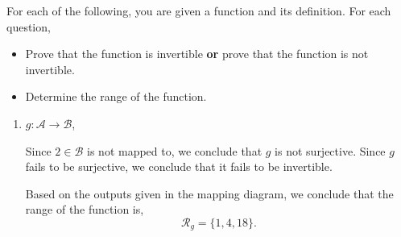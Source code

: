 \documentclass[12pt]{article} %
\begin{document}
\begin{qstn}[2][(8 points)]
  For each of the following, you are given a function and its definition. For each question,
  \begin{itemize}
    \item Prove that the function is invertible \textbf{or} prove that the function is not invertible.
    \item Determine the range of the function.
  \end{itemize}
  \begin{enumerate}[label=(\alph*)]
    \item $g \colon \mathcal{A} \to \mathcal{B}$,
    \begin{center}
  \end{center}

  \begin{solution}
    Since $2 \in \mathcal{B}$ is not mapped to, we conclude that $g$ is not surjective. Since $g$ fails to be
    surjective, we conclude that it fails to be invertible.

    Based on the outputs given in the mapping diagram, we conclude that the range of the function is,
    \[
        \mathcal{R}_g = \{1,4,18\} 
    .\] 
  \end{solution}



  \vspace*{2cm}




\end{enumerate}
\end{qstn}
\end{document}
